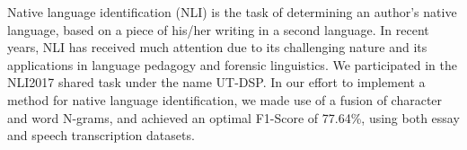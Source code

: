 Native language identification (NLI) is the task of determining an author's native language, based on a piece of his/her writing in a second language. In recent years, NLI has received much attention due to its challenging nature and its applications in language pedagogy and forensic linguistics. We participated in the NLI2017 shared task under the name UT-DSP. In our effort to implement a method for native language identification, we made use of a fusion of character and word N-grams, and achieved an optimal F1-Score of 77.64\%, using both essay and speech transcription datasets.

